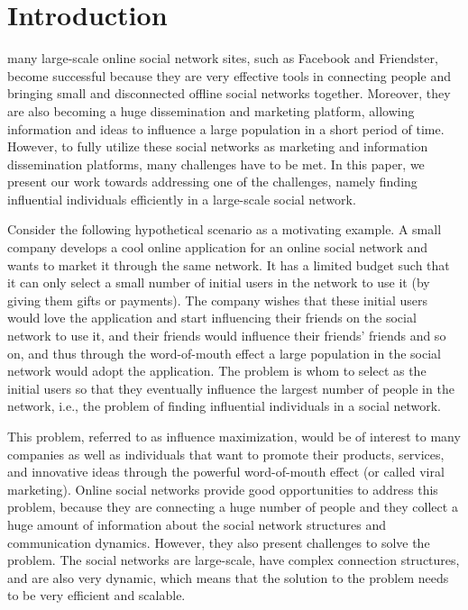 \documentclass[journal,twoside,web]{ieeecolor}
\begin{document}
\section{Introduction}
\label{sec:introduction}
 many large-scale online social network sites, such as Facebook and Friendster, become successful because they are very effective tools in connecting people and bringing small and disconnected offline social networks together. Moreover, they are also becoming a huge dissemination and marketing platform, allowing information and ideas to influence a large population in a short period of time. However, to fully utilize these social networks as marketing and information dissemination platforms, many challenges have to be met. In this paper, we present our work towards addressing one of the challenges, namely finding influential individuals
efficiently in a large-scale social network. \par
Consider the following hypothetical scenario as a motivating example. A small company develops a cool online application for an online social network and wants to market it through the same network. It has a limited budget such that it can only select a small number of initial users in the network to use it (by giving them gifts or payments). The company wishes that these initial users would love the application and start influencing their friends on the social network to use it, and their friends would influence their friends’ friends and so on, and thus through the word-of-mouth effect a
large population in the social network would adopt the application. The problem is whom to select as the initial users so that they eventually influence the largest number of people in the network, i.e., the problem of finding influential individuals in a social network. \par
This problem, referred to as influence maximization, would be of interest to many companies as well as individuals that want to promote their products, services, and innovative ideas through the powerful word-of-mouth effect (or called viral marketing). Online social networks provide good opportunities to address this problem, because they are connecting a huge number of people and they collect a huge amount of information about the social network structures and communication dynamics. However, they also
present challenges to solve the problem. The social networks are large-scale, have complex connection structures, and are also very dynamic, which means that the solution to the problem needs to be very efficient and scalable. \par
\end{document}
